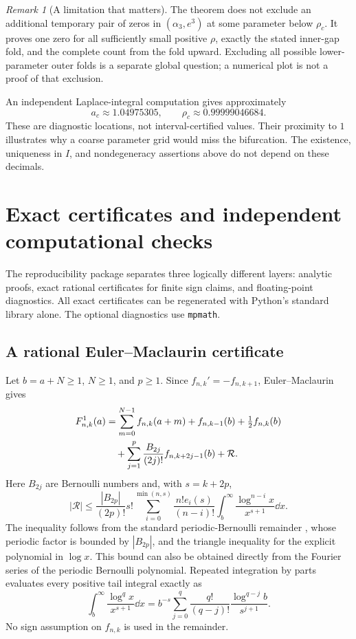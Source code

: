 \documentclass[11pt,letterpaper]{article}
\numberwithin{equation}{section}
\theoremstyle{definition}\newtheorem{definition}[theorem]{Definition}
\theoremstyle{remark}\newtheorem{remark}[theorem]{Remark}
\newcommand{\F}[3]{F_{#1,#2}^{#3}}
\begin{document}
\begin{remark}[A limitation that matters]
The theorem does not exclude an additional temporary pair of zeros in $(\alpha_3,e^3)$ at some parameter below $\rho_c$. It proves one zero for all sufficiently small positive $\rho$, exactly the stated inner-gap fold, and the complete count from the fold upward. Excluding all possible lower-parameter outer folds is a separate global question; a numerical plot is not a proof of that exclusion.
\end{remark}

An independent Laplace-integral computation gives approximately
\[
 a_c\approx1.04975305,\qquad \rho_c\approx0.99999046684.
\]
These are diagnostic locations, not interval-certified values. Their proximity to $1$ illustrates why a coarse parameter grid would miss the bifurcation. The existence, uniqueness in $I$, and nondegeneracy assertions above do not depend on these decimals.

\section{Exact certificates and independent computational checks}\label{sec:certificates}
The reproducibility package separates three logically different layers: analytic proofs, exact rational certificates for finite sign claims, and floating-point diagnostics. All exact certificates can be regenerated with Python's standard library alone. The optional diagnostics use \texttt{mpmath}.

\subsection{A rational Euler--Maclaurin certificate}
Let $b=a+N\ge1$, $N\ge1$, and $p\ge1$. Since $f_{n,k}'=-f_{n,k+1}$, Euler--Maclaurin gives
\begin{align}\label{eq:EM}
 \F nk1(a)
 &=\sum_{m=0}^{N-1}f_{n,k}(a+m)+f_{n,k-1}(b)+\tfrac12f_{n,k}(b)\notag\\
 &\quad+\sum_{j=1}^{p}\frac{B_{2j}}{(2j)!}f_{n,k+2j-1}(b)+\mathcal R.
\end{align}
Here $B_{2j}$ are Bernoulli numbers and, with $s=k+2p$,
\begin{equation}\label{eq:EMbound}
 |\mathcal R|\le\frac{|B_{2p}|}{(2p)!}
 s!\sum_{i=0}^{\min(n,s)}\frac{n!e_i(s)}{(n-i)!}
 \int_b^\infty\frac{\log^{n-i}x}{x^{s+1}}\dd x.
\end{equation}
The inequality follows from the standard periodic-Bernoulli remainder \cite{em}, whose periodic factor is bounded by $|B_{2p}|$, and the triangle inequality for the explicit polynomial in $\log x$. This bound can also be obtained directly from the Fourier series of the periodic Bernoulli polynomial. Repeated integration by parts evaluates every positive tail integral exactly as
\begin{equation}\label{eq:logtail}
 \int_b^\infty\frac{\log^q x}{x^{s+1}}\dd x
 =b^{-s}\sum_{j=0}^q\frac{q!}{(q-j)!}\frac{\log^{q-j}b}{s^{j+1}}.
\end{equation}
No sign assumption on $f_{n,k}$ is used in the remainder.
\end{document}
